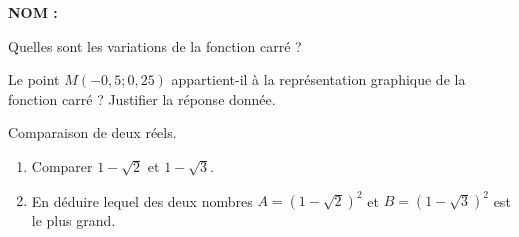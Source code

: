 \documentclass[a4paper,11pt,DIV15,BCOR0mm]{scrartcl}
\begin{document}
\newcommand{\vv}[1]{\vect{#1}}
\noindent\textbf{NOM : }



\begin{exercice}[Cours]
Quelles  sont les variations de la fonction carré ?
\end{exercice}
\vfill


\begin{exercice}
Le point $M(-0,5;0,25)$ appartient-il à la représentation graphique de
la fonction carré ? Justifier la réponse donnée.
\end{exercice}

\vfill
\begin{exercice}
Comparaison de deux réels.
\begin{enumerate}
  \item {} Comparer $1-\sqrt{2}$ et $1-\sqrt{3}$.
  \vfill
  \item En déduire lequel des deux nombres $A=(1-\sqrt{2})^2$ et 
  $B=(1-\sqrt{3})^2$ est le plus grand.
\end{enumerate}
\end{exercice}

\vfill
\vfill
\vfill
\end{document}
